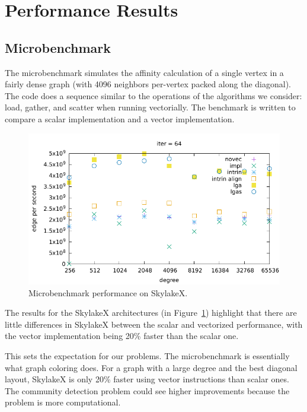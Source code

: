\documentclass[default,iicol]{sn-jnl}%
\theoremstyle{thmstyleone}%
\theoremstyle{thmstyletwo}%
\theoremstyle{thmstylethree}%
\begin{document}

\section{Performance Results}
\subsection{Microbenchmark}

The microbenchmark simulates the affinity calculation of a single
vertex in a fairly dense graph (with 4096 neighbors per-vertex packed
along the diagonal). The code does a sequence similar to the
operations of the algorithms we consider: load, gather, and
scatter when running vectorially. The benchmark is written to
compare a scalar implementation and a vector implementation.

\begin{figure}[!bt]
  \centering
  \includegraphics[page=20,width=.48\linewidth]{ubenchplots/benchmark_SkylakeX.pdf}
  
  \caption{Microbenchmark performance on SkylakeX.}
  \label{fig:microbench}
\end{figure}

The results for the SkylakeX architectures (in Figure~\ref{fig:microbench})
highlight that there are little differences in SkylakeX between
the scalar and vectorized performance, with the vector implementation
being 20\% faster than the scalar one. 

This sets the expectation for our problems. The microbenchmark is
essentially what graph coloring does. For a graph with a large degree
and the best diagonal layout, SkylakeX is only 20\% faster using
vector instructions than scalar ones. The community detection problem 
could see higher improvements because the 
problem is more computational.
\end{document}
